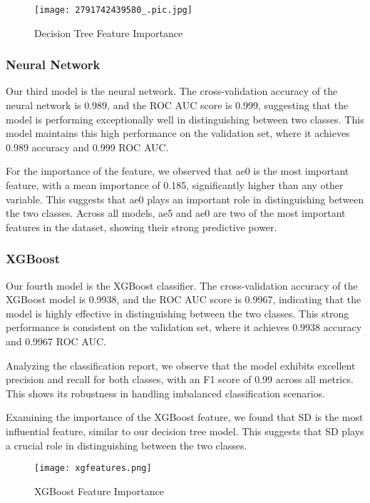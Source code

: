 \documentclass[10pt,letterpaper]{article}
\begin{document}
\begin{figure}[htbp]
    \centering
    \texttt{[image: 2791742439580\_.pic.jpg]}
    \caption{Decision Tree Feature Importance}
    \label{fig:enter-label}
\end{figure}


\subsubsection{Neural Network}

Our third model is the neural network. The cross-validation accuracy of the neural network is 0.989, and the ROC AUC score is 0.999, suggesting that the model is performing exceptionally well in distinguishing between two classes. This model maintains this high performance on the validation set, where it achieves 0.989 accuracy and 0.999 ROC AUC. 

For the importance of the feature, we observed that ae0 is the most important feature, with a mean importance of 0.185, significantly higher than any other variable. This suggests that ae0 plays an important role in distinguishing between the two classes. Across all models, ae5 and ae0 are two of the most important features in the dataset, showing their strong predictive power.

\subsubsection{XGBoost}
Our fourth model is the XGBoost classifier. The cross-validation accuracy of the XGBoost model is 0.9938, and the ROC AUC score is 0.9967, indicating that the model is highly effective in distinguishing between the two classes. This strong performance is consistent on the validation set, where it achieves 0.9938 accuracy and 0.9967 ROC AUC.

Analyzing the classification report, we observe that the model exhibits excellent precision and recall for both classes, with an F1 score of 0.99 across all metrics. This shows its robustness in handling imbalanced classification scenarios.

Examining the importance of the XGBoost feature, we found that SD is the most influential feature, similar to our decision tree model. This suggests that SD plays a crucial role in distinguishing between the two classes. 

\begin{figure}[htbp]
    \centering
    \texttt{[image: xgfeatures.png]}
    \caption{XGBoost Feature Importance}
    \label{fig:enter-label}
\end{figure}
\end{document}

